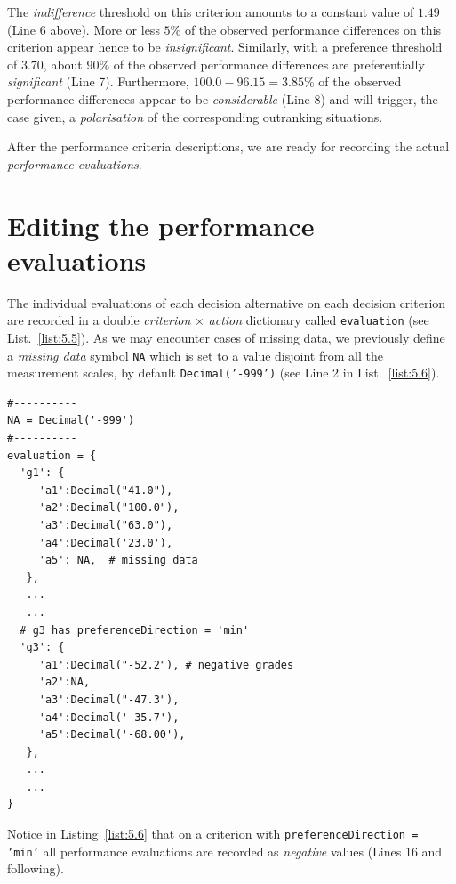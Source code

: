 The \emph{indifference} threshold on this criterion amounts to a constant value of $1.49$ (Line 6 above). More or less $5\%$ of the observed performance differences on this criterion appear hence to be \emph{insignificant}. Similarly, with a preference threshold of $3.70$, about $90\%$ of the observed performance differences are preferentially \emph{significant} (Line 7). Furthermore, $100.0 - 96.15 = 3.85\%$ of the observed performance differences appear to be \emph{considerable} (Line 8) and will trigger, the case given, a \emph{polarisation} of the corresponding outranking situations.

After the performance criteria descriptions, we are ready for recording the actual \emph{performance evaluations}.

\section{Editing the performance evaluations}
\label{sec:5.5}

The individual evaluations of each decision alternative on each decision criterion are recorded in a double \emph{criterion} $\times$ \emph{action} dictionary called \texttt{evaluation} (see List.~\ref{list:5.5}). As we may encounter cases of missing data, we previously define a \emph{missing data} symbol \texttt{NA} which is set to a value disjoint from all the measurement scales, by default \texttt{Decimal('-999')} (see Line 2 in List.~\vref{list:5.6}).
\begin{lstlisting}[caption={Editing performance evaluations},label=list:5.6]
#----------
NA = Decimal('-999')
#----------
evaluation = {
  'g1': {
     'a1':Decimal("41.0"),
     'a2':Decimal("100.0"),
     'a3':Decimal("63.0"),
     'a4':Decimal('23.0'),
     'a5': NA,  # missing data
   },
   ...
   ...
  # g3 has preferenceDirection = 'min'
  'g3': {
     'a1':Decimal("-52.2"), # negative grades
     'a2':NA,
     'a3':Decimal("-47.3"),
     'a4':Decimal('-35.7'),
     'a5':Decimal('-68.00'),
   },
   ...
   ...
}
\end{lstlisting}

Notice in Listing~\vref{list:5.6} that on a criterion with \texttt{preference\-Direction = 'min'} all performance evaluations are recorded as \emph{negative} values (Lines 16 and following).

